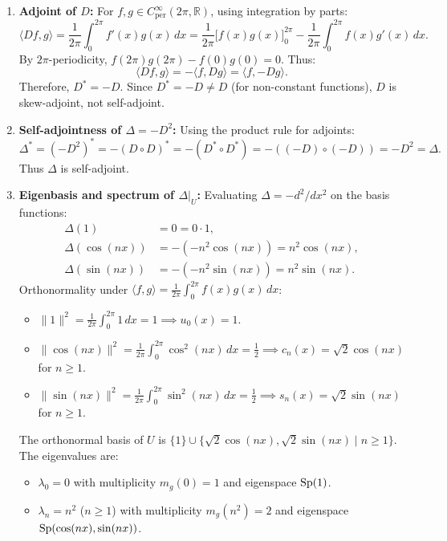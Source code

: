 \begin{exercisesolution}
\label{sol:differential_operators_fourier}
\begin{enumerate}[label=\textbf{(\alph*)}]
    \item \textbf{Adjoint of $D$:}
    For $f, g \in C^\infty_{\text{per}}(2\pi, \mathbb{R})$, using integration by parts:
    \[
    \langle Df, g \rangle = \frac{1}{2\pi} \int_0^{2\pi} f'(x) g(x) \, dx = \frac{1}{2\pi} \big[ f(x) g(x) \big]_0^{2\pi} - \frac{1}{2\pi} \int_0^{2\pi} f(x) g'(x) \, dx.
    \]
    By $2\pi$-periodicity, $f(2\pi)g(2\pi) - f(0)g(0) = 0$. Thus:
    \[
    \langle Df, g \rangle = -\langle f, Dg \rangle = \langle f, -Dg \rangle.
    \]
    Therefore, $D^* = -D$. Since $D^* = -D \ne D$ (for non-constant functions), $D$ is skew-adjoint, not self-adjoint.

    \item \textbf{Self-adjointness of $\Delta = -D^2$:}
    Using the product rule for adjoints:
    \[
    \Delta^* = (-D^2)^* = -(D \circ D)^* = -(D^* \circ D^*) = -((-D) \circ (-D)) = -D^2 = \Delta.
    \]
    Thus $\Delta$ is self-adjoint.

    \item \textbf{Eigenbasis and spectrum of $\Delta|_U$:}
    Evaluating $\Delta = -d^2/dx^2$ on the basis functions:
    \begin{align*}
    \Delta(1) &= 0 = 0 \cdot 1, \\
    \Delta(\cos(nx)) &= -(-n^2 \cos(nx)) = n^2 \cos(nx), \\
    \Delta(\sin(nx)) &= -(-n^2 \sin(nx)) = n^2 \sin(nx).
    \end{align*}
    Orthonormality under $\langle f, g \rangle = \frac{1}{2\pi}\int_0^{2\pi} f(x)g(x)\,dx$:
    \begin{itemize}
        \item $\|1\|^2 = \frac{1}{2\pi} \int_0^{2\pi} 1\,dx = 1 \implies u_0(x) = 1$.
        \item $\|\cos(nx)\|^2 = \frac{1}{2\pi} \int_0^{2\pi} \cos^2(nx)\,dx = \frac{1}{2} \implies c_n(x) = \sqrt{2}\cos(nx)$ for $n \ge 1$.
        \item $\|\sin(nx)\|^2 = \frac{1}{2\pi} \int_0^{2\pi} \sin^2(nx)\,dx = \frac{1}{2} \implies s_n(x) = \sqrt{2}\sin(nx)$ for $n \ge 1$.
    \end{itemize}
    The orthonormal basis of $U$ is $\{1\} \cup \{\sqrt{2}\cos(nx), \sqrt{2}\sin(nx) \mid n \ge 1\}$.
    The eigenvalues are:
    \begin{itemize}
        \item $\lambda_0 = 0$ with multiplicity $m_g(0) = 1$ and eigenspace $\operatorname{Sp}(1)$.
        \item $\lambda_n = n^2$ ($n \ge 1$) with multiplicity $m_g(n^2) = 2$ and eigenspace $\operatorname{Sp}(\cos(nx), \sin(nx))$. \qedhere
    \end{itemize}
\end{enumerate}
\end{exercisesolution}

